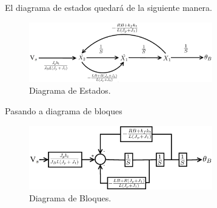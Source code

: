 \documentclass[a4paper]{IEEEtran} %
\begin{document}
El diagrama de estados quedará de la siguiente manera. 
\begin{figure}[h]
    \centering
        \includegraphics[width=8cm]{images/estados.eps}
        \caption{Diagrama de Estados.}
        \label{fig:states}
\end{figure}

Pasando a diagrama de bloques 
\begin{figure}[h]
    \centering
        \includegraphics[width=8cm]{images/bloques.eps}
        \caption{Diagrama de Bloques.}
        \label{fig:bloques}
\end{figure}
\vspace{100mm}


\end{document}
